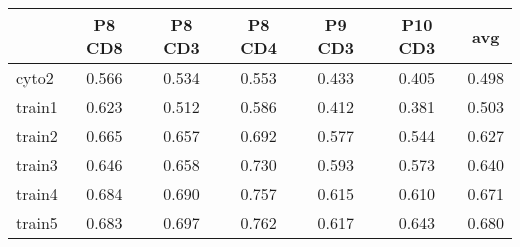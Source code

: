 \begin{tabular}{lcccccc}
   \hline  &P8 CD8& P8 CD3& P8 CD4& P9 CD3& P10 CD3& avg\\ 
\hline
cyto2 & 0.566 & 0.534 & 0.553 & 0.433 & 0.405 & 0.498 \\ 
  train1 & 0.623 & 0.512 & 0.586 & 0.412 & 0.381 & 0.503 \\ 
  train2 & 0.665 & 0.657 & 0.692 & 0.577 & 0.544 & 0.627 \\ 
  train3 & 0.646 & 0.658 & 0.730 & 0.593 & 0.573 & 0.640 \\ 
  train4 & 0.684 & 0.690 & 0.757 & 0.615 & 0.610 & 0.671 \\ 
  train5 & 0.683 & 0.697 & 0.762 & 0.617 & 0.643 & 0.680 \\ 
   \hline
\end{tabular}
